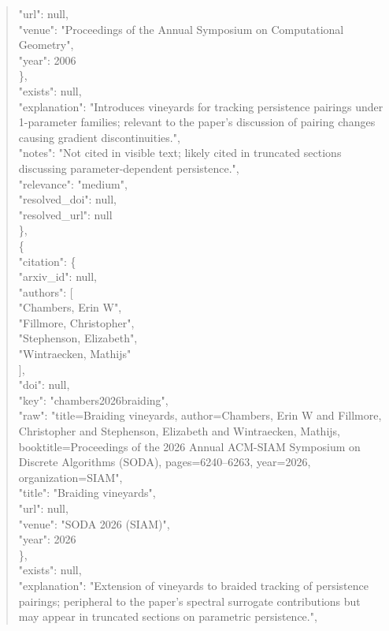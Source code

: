 \documentclass[11pt]{article}
\begin{document}
\begin{quote}
        "url": null,\\
        "venue": "Proceedings of the Annual Symposium on Computational Geometry",\\
        "year": 2006\\
      \},\\
      "exists": null,\\
      "explanation": "Introduces vineyards for tracking persistence pairings under 1-parameter families; relevant to the paper's discussion of pairing changes causing gradient discontinuities.",\\
      "notes": "Not cited in visible text; likely cited in truncated sections discussing parameter-dependent persistence.",\\
      "relevance": "medium",\\
      "resolved\_doi": null,\\
      "resolved\_url": null\\
    \},\\
    \{\\
      "citation": \{\\
        "arxiv\_id": null,\\
        "authors": [\\
          "Chambers, Erin W",\\
          "Fillmore, Christopher",\\
          "Stephenson, Elizabeth",\\
          "Wintraecken, Mathijs"\\
        ],\\
        "doi": null,\\
        "key": "chambers2026braiding",\\
        "raw": "title=Braiding vineyards, author=Chambers, Erin W and Fillmore, Christopher and Stephenson, Elizabeth and Wintraecken, Mathijs, booktitle=Proceedings of the 2026 Annual ACM-SIAM Symposium on Discrete Algorithms (SODA), pages=6240--6263, year=2026, organization=SIAM",\\
        "title": "Braiding vineyards",\\
        "url": null,\\
        "venue": "SODA 2026 (SIAM)",\\
        "year": 2026\\
      \},\\
      "exists": null,\\
      "explanation": "Extension of vineyards to braided tracking of persistence pairings; peripheral to the paper's spectral surrogate contributions but may appear in truncated sections on parametric persistence.",\\

\end{quote}
\end{document}
